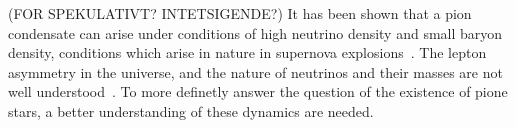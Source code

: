 (FOR SPEKULATIVT? INTETSIGENDE?)
It has been shown that a pion condensate can arise under conditions of high neutrino density and small baryon density, conditions which arise in nature in supernova explosions~\cite{abduki:Pion_condensation_in_a_dense_neutrino_gas}.
The lepton asymmetry in the universe, and the nature of neutrinos and their masses are not well understood~\cite{Schwartz:QFT,Schwarz_2009:Lepton_asymmetry_and_the_cosmic_QCD_transition}.
To more definetly answer the question of the existence of pione stars, a better understanding of these dynamics are needed.
